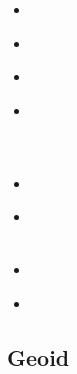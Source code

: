 \begin{scriptsize}
\begin{itemize}
\item[\twothousandnine] 
\textcite{simp09} \\
\item[\twothousandten] 
\textcite{resb10} \\
\item[\twothousandeleven] 
\textcite{freh11} \\
\item[\twothousandtwelve] 
\textcite{reds12} \\
\textcite{grsc12} \\
\textcite{scsc12} \\
\item[\twothousandthirteen] 
\textcite{regc13} \\
\item[\twothousandfourteen] 
\textcite{freh14} \\ 
\textcite{frex14} \\
\item[\twothousandsixteen] 
\textcite{frsc16} \\
\item[\twothousandtwentyone] 
\textcite{nafo21} \\
\end{itemize}
\end{scriptsize}

\subsection{Geoid}


